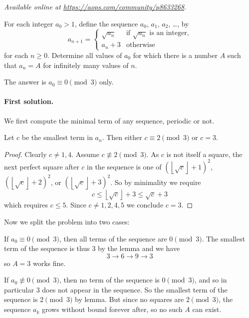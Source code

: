 \textsl{Available online at \url{https://aops.com/community/p8633268}.}
\begin{mdframed}[style=mdpurplebox,frametitle={Problem statement}]
For each integer $a_0 > 1$, define the sequence $a_0$, $a_1$, $a_2$,
\dots, by
\[
  a_{n+1} =
  \begin{cases}
    \sqrt{a_n} & \text{if $\sqrt{a_n}$ is an integer,} \\
    a_n + 3 & \text{otherwise}
  \end{cases}
\]
for each $n \ge 0$.
Determine all values of $a_0$ for which there is a number $A$
such that $a_n = A$ for infinitely many values of $n$.
\end{mdframed}
The answer is $a_0 \equiv 0 \pmod 3$ only.

\paragraph{First solution.}
We first compute the minimal term of any sequence, periodic or not.

\begin{lemma*}
  Let $c$ be the smallest term in $a_n$.
  Then either $c \equiv 2 \pmod 3$ or $c = 3$.
\end{lemma*}
\begin{proof}
  Clearly $c \neq 1, 4$.
  Assume $c \not\equiv 2 \pmod 3$.
  As $c$ is not itself a square,
  the next perfect square after $c$ in the sequence
  is one of $\left( \left\lfloor \sqrt c \right\rfloor + 1\right)^2$,
  $\left( \left\lfloor \sqrt c \right\rfloor + 2\right)^2$,
  or $\left( \left\lfloor \sqrt c \right\rfloor + 3\right)^2$.
  So by minimality we require
  \[ c \le \left\lfloor \sqrt c \right\rfloor + 3 \le \sqrt c + 3 \]
  which requires $c \le 5$.
  Since $c \neq 1,2,4,5$ we conclude $c = 3$.
\end{proof}

Now we split the problem into two cases:

\begin{itemize}
\ii If $a_0 \equiv 0 \pmod 3$, then all terms of the sequence are $0 \pmod 3$.
The smallest term of the sequence is thus $3$ by the lemma
and we have \[ 3 \to 6 \to 9 \to 3 \]
so $A = 3$ works fine.

\ii If $a_0 \not\equiv 0 \pmod 3$,
then no term of the sequence is $0 \pmod 3$,
and so in particular $3$ does not appear in the sequence.
So the smallest term of the sequence is $2 \pmod 3$ by lemma.
But since no squares are $2 \pmod 3$,
the sequence $a_k$ grows without bound forever after,
so no such $A$ can exist.
\end{itemize}

